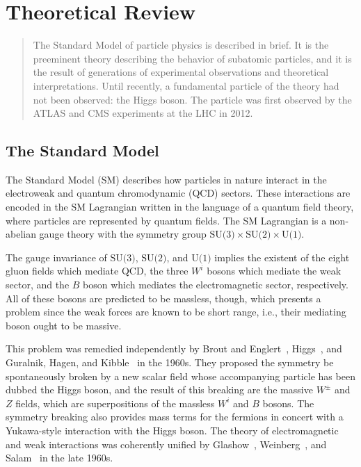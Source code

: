 \chapter[Theoretical Review][Theoretical Review]{Theoretical Review}
\label{chap:standardmodel}

\begin{quote}
  The Standard Model of particle physics is described in brief. It is the preeminent theory describing the behavior of subatomic particles, and it is the result of generations of experimental observations and theoretical interpretations. Until recently, a fundamental particle of the theory had not been observed: the Higgs boson. The particle was first observed by the ATLAS and CMS experiments at the LHC in 2012.
\end{quote}

\section{The Standard Model}

The Standard Model (SM) describes how particles in nature interact in the electroweak and quantum chromodynamic (QCD) sectors. These interactions are encoded in the SM Lagrangian written in the language of a quantum field theory, where particles are represented by quantum fields. The SM Lagrangian is a non-abelian gauge theory with the symmetry group $\text{SU(3)}\times\text{SU(2)}\times\text{U(1)}$. 

The gauge invariance of $\text{SU(3)}$, $\text{SU(2)}$, and $\text{U(1)}$ implies the existent of the eight gluon fields which mediate QCD, the three $W^i$ bosons which mediate the weak sector, and the $B$ boson which mediates the electromagnetic sector, respectively. All of these bosons are predicted to be massless, though, which presents a problem since the weak forces are known to be short range, i.e., their mediating boson ought to be massive.

This problem was remedied independently by Brout and Englert~\cite{1964.Englert.symmetry_breaking}, Higgs~\cite{1964.Higgs.Broken_Symmetries_1,1964.Higgs.Broken_Symmetries_2}, and Guralnik, Hagen, and Kibble~\cite{1964.Guralnik-Hagen-Kibble.symmetry_breaking} in the 1960s. They proposed the symmetry be spontaneously broken by a new scalar field whose accompanying particle has been dubbed the Higgs boson, and the result of this breaking are the massive $W^\pm$ and $Z$ fields, which are superpositions of the massless $W^i$ and $B$ bosons. The symmetry breaking also provides mass terms for the fermions in concert with a Yukawa-style interaction with the Higgs boson. The theory of electromagnetic and weak interactions was coherently unified by Glashow~\cite{1961.Glashow.Partial-symmetries}, Weinberg~\cite{1967.Weinberg.A_model_of_leptons}, and Salam~\cite{1968.Salam.weak-and-EM} in the late 1960s.

